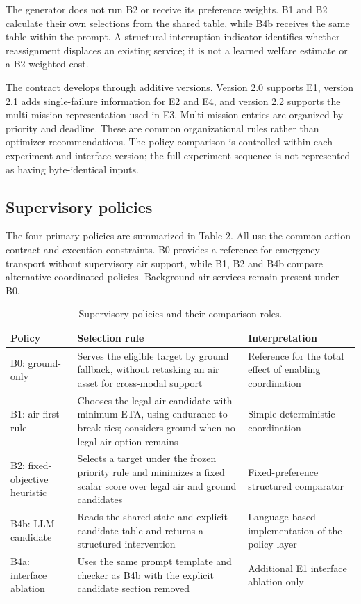 \documentclass[]{interact}
\theoremstyle{plain}
\theoremstyle{definition}
\theoremstyle{remark}
\begin{document}
The generator does not run B2 or receive its preference weights. B1 and B2 calculate their own selections from the shared table, while B4b receives the same table within the prompt. A structural interruption indicator identifies whether reassignment displaces an existing service; it is not a learned welfare estimate or a B2-weighted cost.

The contract develops through additive versions. Version 2.0 supports E1, version 2.1 adds single-failure information for E2 and E4, and version 2.2 supports the multi-mission representation used in E3. Multi-mission entries are organized by priority and deadline. These are common organizational rules rather than optimizer recommendations. The policy comparison is controlled within each experiment and interface version; the full experiment sequence is not represented as having byte-identical inputs.

\subsection{Supervisory policies}

The four primary policies are summarized in Table 2. All use the common action contract and execution constraints. B0 provides a reference for emergency transport without supervisory air support, while B1, B2 and B4b compare alternative coordinated policies. Background air services remain present under B0.

\begin{table}[!htbp]
\centering
\small
\setlength{\tabcolsep}{3pt}
\caption{Supervisory policies and their comparison roles.}
\label{tab:table2}
\begin{tabularx}{\textwidth}{@{}YYY@{}}
\toprule
Policy & Selection rule & Interpretation \\
\midrule
B0: ground-only & Serves the eligible target by ground fallback, without retasking an air asset for cross-modal support & Reference for the total effect of enabling coordination \\
B1: air-first rule & Chooses the legal air candidate with minimum ETA, using endurance to break ties; considers ground when no legal air option remains & Simple deterministic coordination \\
B2: fixed-objective heuristic & Selects a target under the frozen priority rule and minimizes a fixed scalar score over legal air and ground candidates & Fixed-preference structured comparator \\
B4b: LLM-candidate & Reads the shared state and explicit candidate table and returns a structured intervention & Language-based implementation of the policy layer \\
B4a: interface ablation & Uses the same prompt template and checker as B4b with the explicit candidate section removed & Additional E1 interface ablation only \\
\bottomrule
\end{tabularx}
\end{table}
\end{document}
